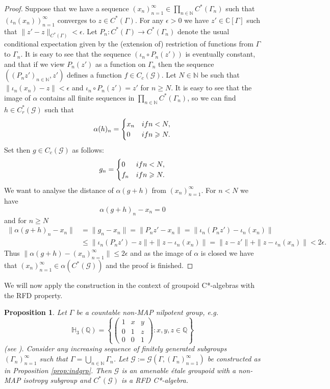 \documentclass[11 pt, leqno, hidelinks]{amsart}%
\theoremstyle{plain}
\newtheorem{proposition}[theorem]{Proposition}
\numberwithin{equation}{section}
\newcommand{\C}{\mathbb{C}}
\newcommand{\N}{\mathbb{N}}
\newcommand{\GG}{\mathcal{G}}
\begin{document}
\begin{proof}
 Suppose that we have a sequence $(x_n)_{n=1}^\infty \in \prod_{n\in \N} C^*(\Gamma_n)$ such that $(\iota_n(x_n))_{n=1}^\infty$ converges to $z \in C^*(\Gamma)$. For any $\epsilon >0$ we have $z' \in \C[\Gamma]$ such that $\|z'-z\|_{C^*(\Gamma)}< \epsilon$. Let $P_n:C^*(\Gamma) \to C^*(\Gamma_n)$ denote the usual conditional expectation given by the (extension of) restriction of functions from $\Gamma$ to $\Gamma_n$. It is easy to see that the sequence $(\iota_n\circ P_n (z'))$ is eventually constant, and that if we view $P_n(z')$ as a function on $\Gamma_n$ then the sequence $((P_n z')_{n \in \N}, z')$ defines a function $f \in C_c(\GG)$. Let $N\in \N$ be such that $\|\iota_n(x_n) - z\| < \epsilon$ and $\iota_n\circ P_n (z') = z'$ for $n\geqslant N$. It is easy to see that the image of $\alpha$ contains all finite sequences in $\prod_{n\in \N}C^*(\Gamma_n)$, so we can find $h\in C^*_r(\GG)$ such that
\[ \alpha(h)_n = \begin{cases} x_n & \textup { if }  n <N, \\ 0 & \textup { if }  n \geqslant N.  \end{cases}\]
 Set then $g \in C_c(\GG)$ as follows:
 \[ g_n = \begin{cases} 0 & \textup { if }  n <N, \\ f_n &\textup { if }  n \geqslant N.  \end{cases}\]
We want to analyse the distance of $\alpha(g+h)$ from $(x_n)_{n=1}^\infty$. For $n <N$ we have
\[ \alpha(g+h)_n - x_n = 0\]
and for $n \geq N$
\begin{align*} \|\alpha(g+h)_n - x_n \|&=\|g_n - x_n\| = \|P_n z' - x_n \|  = \|\iota_n(P_n z') - \iota_n (x_n)\| \\&\leq \|\iota_n(P_n z') - z \|+\|z - \iota_n(x_n)\|
=\|z - z' \| +\|z - \iota_n(x_n)\| < 2 \epsilon.\end{align*}
Thus $\|\alpha(g+h) - (x_n)_{n=1}^\infty \| \leq 2 \epsilon$ and
as the image of $\alpha$ is closed we have that  $ (x_n)_{n=1}^\infty \in \alpha(C^*(\GG))$ and the proof is finished.
\end{proof}

We will now apply the construction in the context of groupoid C*-algebras with the RFD property.
\begin{proposition}\label{prop:cntrex}
Let $\Gamma$ be a countable non-MAP nilpotent group, e.g.\ $$\mathbb H_3(\mathbb Q) = \left\{  \left( \begin{array}{ccc}  1 & x & y \\ 0 & 1 & z\\ 0 & 0 & 1 \end{array}  \right) : x,y,z\in \mathbb Q \right\}$$  (see \cite[Section 4]{ES}). Consider any increasing sequence of finitely generated subgroups  $(\Gamma_n)_{n=1}^\infty$ such that $\Gamma=\bigcup_{n\in \N} \Gamma_n$.
Let $\GG:=\GG(\Gamma, (\Gamma_n)_{n=1}^\infty)$ be constructed as in Proposition \ref{prop:indgrp}. Then $\GG$ is an amenable \'etale groupoid with a non-MAP isotropy subgroup
and $C^*(\GG)$ is a RFD C*-algebra.
\end{proposition}
\end{document}
